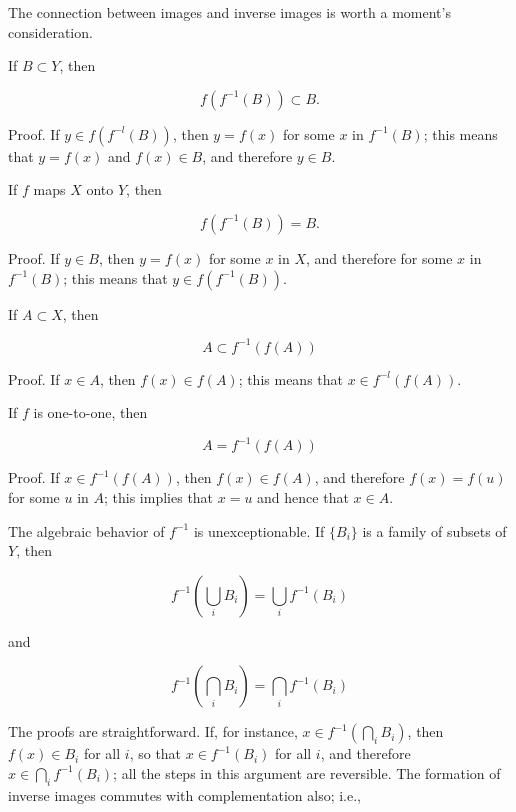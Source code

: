 The connection between images and inverse images is worth a moment's consideration. 

If $B \subset Y$, then

\begin{equation*} 
f(f^{-1}(B)) \subset B.
\end{equation*}

Proof. If $y \in f(f^{-l}(B))$, then $y = f(x)$ for some $x$ in $f^{-1}(B)$; this means that $y = f(x)$ and $f(x) \in B$, and therefore $y \in B$. 

If $f$ maps $X$ onto $Y$, then 

\begin{equation*} 
f(f^{-1}(B)) = B.
\end{equation*}

Proof. If $y \in B$, then $y = f(x)$ for some $x$ in $X$, and therefore for some $x$ in $f^{-1}(B)$; this means that $y \in f(f^{-1}(B))$. 

If $A \subset X$, then 

\begin{equation*}
A \subset f^{-1}(f(A))
\end{equation*}

Proof. If $x \in A$, then $f(x) \in f(A)$; this means that $x \in f^{-l}(f(A))$.

If $f$ is one-to-one, then 

\begin{equation*}
A = f^{-1}(f(A))
\end{equation*}

Proof. If $x \in f^{-1}(f(A))$, then $f(x) \in f(A)$, and therefore $f(x) = f(u)$ for some $u$ in $A$; this implies that $x = u$ and hence that $x \in A$. 


The algebraic behavior of $f^{-1}$ is unexceptionable. If $ \{ B_{i} \} $ is a family of subsets of $Y$, then 

\begin{equation*}
f^{-1}( \bigcup_{i} B_{i} ) = \bigcup_{i}f^{-1}(B_{i})
\end{equation*}

and

\begin{equation*}
f^{-1}( \bigcap_{i} B_{i} ) = \bigcap_{i}f^{-1}(B_{i})
\end{equation*}

The proofs are straightforward. If, for instance, $x \in f^{-1}( \bigcap_{i} B_{i})$, then $f(x) \in B_{i}$ for all $i$, so that $x \in f^{-1}(B_{i})$ for all $i$, and therefore $x \in \bigcap_{i}f^{-1}(B_{i})$; all the steps in this argument are reversible. The formation of inverse images commutes with complementation also; i.e., 

